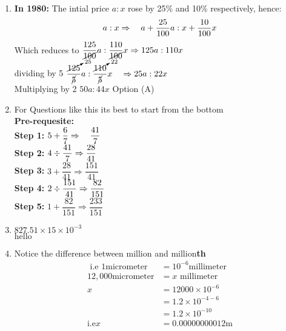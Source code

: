 \begin{multicols}{2}
\begin{enumerate}[label={\textbf{\arabic*.}}]
    \item \textbf{In 1980:} The intial price \(a : x\) rose by 25\% and 10\% respectively, hence:
    \[a:x \Rightarrow \hspace{10px} a + \dfrac{25}{100}a : x + \dfrac{10}{100}x\]
    Which reduces to \(\dfrac{125}{\cancel{100}}a : \dfrac{110}{\cancel{100}}x \Rightarrow {125}a : 110x  \) \vspace{5px} \\
    dividing by 5 \(\dfrac{\cancelto{25}{125}}{\cancel{5}} a : \dfrac{\cancelto{22}{110}}{\cancel{5}} x \hspace {10px}\Rightarrow 25a : 22x \) \vspace{5px}\\
    Multiplying by 2 \hspace{10px} \(50a : 44x\) \hspace{5px}Option (A)
    \[\]

    \item For Questions like this its best to start from the bottom \\
    \textbf{Pre-requesite:} \\
     \textbf{Step 1:} \hspace{10px}\( 5 + \dfrac{6}{7} \Rightarrow \hspace{10px} \dfrac{41}{7}\) \vspace{5px} \\
     \textbf{Step 2:} \hspace{10px}\(4 \divisionsymbol \dfrac{41}{7} \Rightarrow \dfrac{28}{41}  \) \vspace{5px} \\
     \textbf{Step 3:} \hspace{10px}\(3 + \dfrac{28}{41} \Rightarrow \dfrac{151}{41}\) \vspace{5px}\\
     \textbf{Step 4:} \hspace{10px}$2 \divisionsymbol \dfrac{151}{41} \Rightarrow \dfrac{82}{151}$\\
     \textbf{Step 5:} \hspace{10px} \( 1 + \dfrac{82}{151} \Rightarrow \dfrac{233}{151}\) \\ 
    
    \item \(827.51 \times 15 \times 10^{-3}\) \\
    \(\text{hello}\)
    \item Notice the difference between million and million\textbf{th}
    \begin{align*}
    \text{  i.e } 1 \text{micrometer} &= 10^{-6}\text{millimeter} \\
    12,000 \text{micrometer} &= x \text{ millimeter} \\
    x &= 12000 \times 10^{-6}  \\
    &= 1.2 \times 10^{-4 -6 } \\
    &= 1.2 \times 10^{-10} \\
    \text{i.e}  x &= 0.00000000012 \text{m}
    \end{align*}


\end{enumerate}
\end{multicols}
